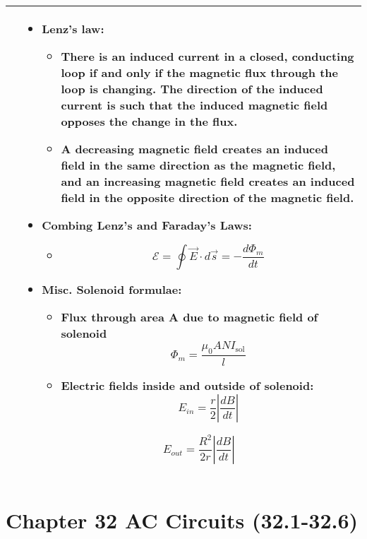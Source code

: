 \documentclass{article}
\begin{document}
\begin{center}
\begin{tabular}{|p{8cm}|p{8cm}|}
		 &

		\begin{itemize}

			\item Lenz's law:
			      \begin{itemize}
				      \item There is an induced current in a closed, conducting loop if
				            and only if the magnetic flux through the loop is changing.
				            The direction of the induced current is such that the induced
				            magnetic field opposes the change in the flux.
				      \item A decreasing magnetic field creates an induced field in the same direction as the magnetic field, and an increasing magnetic field creates an induced field in the opposite direction of the magnetic field.
			      \end{itemize}
			\item Combing Lenz's and Faraday's Laws:
			      \begin{itemize}
				      \item  \[ \mathcal{E} = \oint \vec{E} \cdot d\vec{s} = -\frac{d\Phi_m}{dt}\]
			      \end{itemize}

			\item Misc. Solenoid formulae:
				  \begin{itemize}
					  \item Flux through area A due to magnetic field of solenoid\[ \Phi_m = \frac{\mu_0 A N I_\text{sol}}{l} \]
       \item Electric fields inside and outside of solenoid:
       \[E_{in} = \frac{r}{2}\left\lvert \frac{dB}{dt} \right\rvert \]
				  \end{itemize}
		\[E_{out} = \frac{R^2}{2r}\left\lvert \frac{dB}{dt} \right\rvert \]

		\end{itemize}

		\\
		\hline
	\end{tabular}
\end{center}

\hrulefill

\LARGE 
\section*{Chapter 32 AC Circuits (32.1-32.6)}

\hrulefill
\end{document}

